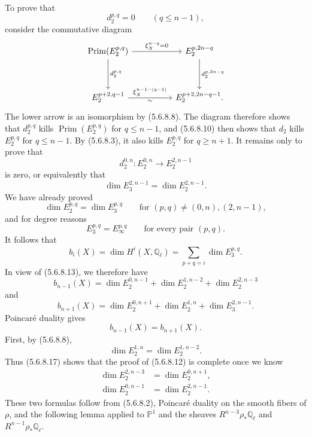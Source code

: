 To prove that
\[
d_2^{p,q}=0\qquad(q\leq n-1),
\]
consider the commutative diagram
\[
\begin{tikzcd}[column sep=huge,row sep=huge]
\operatorname{Prim}(E_2^{p,q})
  \arrow[r,"\xi_X^{n-q}=0"]
  \arrow[d,"d_2^{p,q}"]
&
E_2^{p,2n-q}
  \arrow[d,"d_2^{p,2n-q}"]
\\
E_2^{p+2,q-1}
  \arrow[r,"\xi_X^{n-1-(q-1)}","\sim"']
&
E_2^{p+2,2n-q-1}.
\end{tikzcd}
\]
The lower arrow is an isomorphism by (5.6.8.8).  The diagram therefore shows
that $d_2^{p,q}$ kills $\operatorname{Prim}(E_2^{p,q})$ for $q\leq n-1$,
and (5.6.8.10) then shows that $d_2$ kills $E_2^{p,q}$ for $q\leq n-1$.
By (5.6.8.3), it also kills $E_2^{p,q}$ for $q\geq n+1$.  It remains only
to prove that
\[
d_2^{0,n}:E_2^{0,n}\longrightarrow E_2^{2,n-1}
\]
is zero, or equivalently that
\begin{equation}\tag{5.6.8.12}
\dim E_3^{2,n-1}=\dim E_2^{2,n-1}.
\end{equation}
We have already proved
\begin{equation}\tag{5.6.8.13}
\dim E_2^{p,q}=\dim E_3^{p,q}
\qquad\text{for }(p,q)\neq(0,n),(2,n-1),
\end{equation}
and for degree reasons
\begin{equation}\tag{5.6.8.14}
E_3^{p,q}=E_\infty^{p,q}
\qquad\text{for every pair }(p,q).
\end{equation}
It follows that
\[
b_i(X)=\dim H^i(X,\mathbb Q_\ell)
=\sum_{p+q=i}\dim E_3^{p,q}.
\]
In view of (5.6.8.13), we therefore have
\begin{equation}\tag{5.6.8.15}
b_{n-1}(X)
=\dim E_2^{0,n-1}
 +\dim E_2^{1,n-2}
 +\dim E_2^{2,n-3}
\end{equation}
and
\begin{equation}\tag{5.6.8.16}
b_{n+1}(X)
=\dim E_2^{0,n+1}
 +\dim E_2^{1,n}
 +\dim E_3^{2,n-1}.
\end{equation}
Poincaré duality gives
\begin{equation}\tag{5.6.8.17}
b_{n-1}(X)=b_{n+1}(X).
\end{equation}
First, by (5.6.8.8),
\[
\dim E_2^{1,n}=\dim E_2^{1,n-2}.
\]
Thus (5.6.8.17) shows that the proof of (5.6.8.12) is complete once we know
\begin{align}
\dim E_2^{2,n-3}&=\dim E_2^{0,n+1},
\tag{5.6.8.18}\\
\dim E_2^{0,n-1}&=\dim E_2^{2,n-1}.
\tag{5.6.8.19}
\end{align}
These two formulas follow from (5.6.8.2), Poincaré duality on the smooth
fibers of $\rho$, and the following lemma applied to $\mathbb P^1$ and the
sheaves $R^{n-3}\rho_*\mathbb Q_\ell$ and
$R^{n-1}\rho_*\mathbb Q_\ell$.

